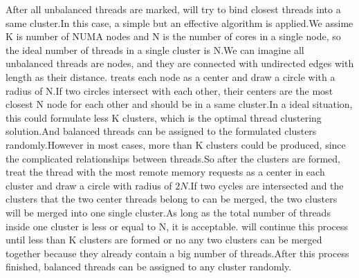 After all unbalanced threads are marked, \NP{} will try to bind closest threads into a same cluster.In this case, a simple but an effective algorithm is applied.We assime K is number of NUMA nodes and N is the number of cores in a single node, so the ideal number of threads in a single cluster is N.We can imagine all unbalanced threads are nodes, and they are connected with undirected edges with length as their distance.\NP{} treats each node as a center and draw a circle with a radius of N.If two circles intersect with each other, their centers are the most closest N node for each other and should be in a same cluster.In a ideal situation, this could formulate less K clusters, which is the optimal thread clustering solution.And balanced threads can be assigned to the formulated clusters randomly.However in most cases, more than K clusters could be produced, since the complicated relationships between threads.So after the clusters are formed, \NP{} treat the thread with the most remote memory requests as a center in each cluster and draw a circle with radius of $2N$.If two cycles are intersected and the clusters that the two center threads belong to can be merged, the two clusters will be merged into one single cluster.As long as the total number of threads inside one cluster is less or equal to N, it is acceptable. \NP{} will continue this process until less than K clusters are formed or no any two clusters can be merged together because they already contain a big number of threads.After this process finished, balanced threads can be assigned to any cluster randomly. 
